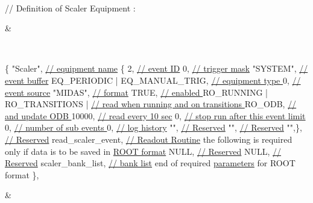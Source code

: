 \begin{TabularC}{2}
\begin{DoxyPre}\end{DoxyPre}
   \\
// Definition of Scaler Equipment :\par
  &\par
  

\\

\begin{DoxyPre}
\{ "Scaler",                          \hyperlink{FE_table_FE_tbl_EqName}{// equipment name}
     \{ 2,                            \hyperlink{FE_table_FE_tbl_EventID}{// event ID}
       0,                            \hyperlink{FE_table_FE_tbl_TrigMask}{// trigger mask}
       "SYSTEM",                     \hyperlink{FE_table_FE_tbl_Buffer}{// event buffer}
       EQ\_PERIODIC | EQ\_MANUAL\_TRIG, \hyperlink{FE_table_FE_tbl_EqType}{// equipment type }
       0,                            \hyperlink{FE_table_FE_tbl_IntSrc}{// event source}
       "MIDAS",                      \hyperlink{FE_table_FE_tbl_Format}{// format}
       TRUE,                         \hyperlink{FE_table_FE_tbl_EqEnabled}{// enabled }
       RO\_RUNNING | RO\_TRANSITIONS | \hyperlink{FE_table_FE_tbl_ReadOn}{// read when running and on transitions }      
       RO\_ODB,                       \hyperlink{FE_table_FE_tbl_ReadOn}{// and update ODB }
       10000,                        \hyperlink{FE_table_FE_tbl_Period}{// read every 10 sec}
       0,                            \hyperlink{FE_table_FE_tbl_EventLimit}{// stop run after this event limit }
       0,                            \hyperlink{FE_table_FE_tbl_NumSubevents}{// number of sub events }
       0,                            \hyperlink{FE_table_FE_tbl_History}{// log history} 
       "",                           \hyperlink{FE_table_FE_tbl_Reserved}{// Reserved}
       "",                           \hyperlink{FE_table_FE_tbl_Reserved}{// Reserved}
       "",\},                         \hyperlink{FE_table_FE_tbl_Reserved}{// Reserved}
       read\_scaler\_event,            \hyperlink{FE_table_FE_tbl_ReadoutRoutine}{// Readout Routine} 
the following is required only if data is to be saved in \hyperlink{FE_eqdec_FE_ROOT_Structure_Def}{ROOT format}
       NULL,                         \hyperlink{FE_table_FE_tbl_ClassDriver}{// Reserved}
       NULL,                         \hyperlink{FE_table_FE_tbl_DevDriverList}{// Reserved}
       scaler\_bank\_list,             \hyperlink{FE_table_FE_tbl_BankDef}{// bank list}
end of required \hyperlink{structparameters}{parameters} for ROOT format
     \},
\end{DoxyPre}
 &
\begin{DoxyPre}\end{DoxyPre}




\end{TabularC}
